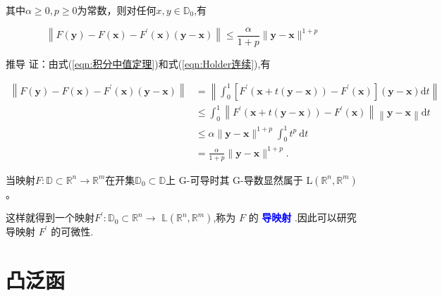 \documentclass{lzureport}
\begin{document}
其中$\alpha\geqslant0,p\geqslant0$为常数，则对任何$x,y\in\mathbb{D}_0$,有

$$\left\|F(\mathbf{y})-F(\mathbf{x})-F^{\prime}(\mathbf{x})(\mathbf{y}-\mathbf{x})\right\|\leqslant\frac{\alpha}{1+p}\|\mathbf{y}-\mathbf{x}\|^{1+p}$$

\begin{derivation}{推导}
	证：由式(\ref{eqn:积分中值定理})和式(\ref{eqn:Holder连续}),有
	
	$$\begin{aligned}
		\left\|F(\mathbf{y})-F(\mathbf{x})-F^{\prime}(\mathbf{x})(\mathbf{y}-\mathbf{x})\right\|&=\left\|\int_0^1\left[F^{\prime}(\boldsymbol{x}+t(\boldsymbol{y}-\boldsymbol{x}))-F^{\prime}(\boldsymbol{x})\right](\boldsymbol{y}-\boldsymbol{x})\mathrm{d}t\right\|\\
		&\leqslant\int_0^1\left\|F^{\prime}(\boldsymbol{x}+t(\boldsymbol{y}-\boldsymbol{x}))-F^{\prime}(\boldsymbol{x})\right\|\left\|\boldsymbol{y}-\boldsymbol{x}\right\|\mathrm{d}t\\
		&\leqslant\alpha\|\mathbf{y}-\boldsymbol{x}\|^{1+p}\int_0^1t^p\:\mathrm{d}t\\
		&=\frac\alpha{1+p}\|\mathbf{y}-\boldsymbol{x}\|^{1+p}.
	\end{aligned}$$
	
	当映射$F:\mathbb{D}\subset\mathbb{R}^n\to\mathbb{R}^m$在开集$\mathbb{D}_0\subset\mathbb{D}$上 G-可导时其 G-导数显然属于 L$(\mathbb{R}^n,\mathbb{R}^m)$。
	
	这样就得到一个映射$F^\prime:\mathbb{D}_0\subset\mathbb{R}^n\to$ $\mathbb{L}\left(\mathbb{R}^n,\mathbb{R}^m\right)$,称为 $F$ 的 \textcolor{blue}{\textbf{导映射}} .因此可以研究导映射 $F^\prime$ 的可微性.	
\end{derivation}

\section{凸泛函}

	
\end{document}
